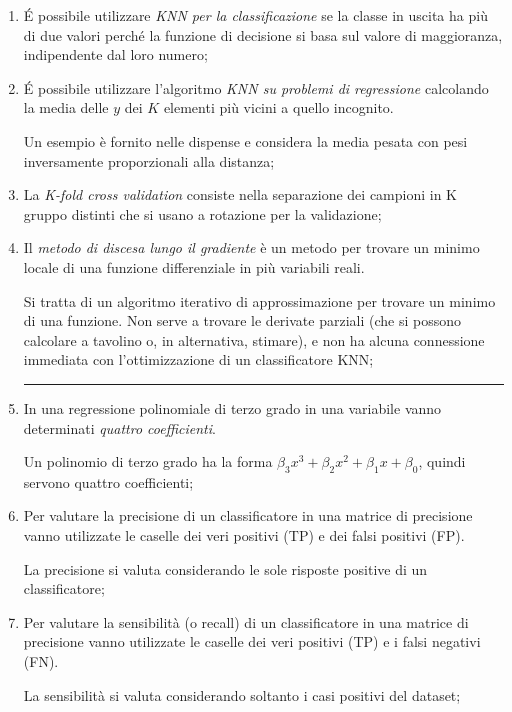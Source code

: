 \begin{enumerate}
	\item \'E possibile utilizzare \emph{KNN per la classificazione} se la classe in uscita ha più di due valori perché la funzione di decisione si basa sul valore di maggioranza, indipendente dal loro numero;

	\item \'E possibile utilizzare l’algoritmo \emph{KNN su problemi di regressione} calcolando la media delle \( y \) dei \( K \) elementi più vicini a quello incognito.

	Un esempio è fornito nelle dispense e considera la media pesata con pesi inversamente proporzionali alla distanza;

	\item La \emph{K-fold cross validation} consiste nella separazione dei campioni in K gruppo distinti che si usano a rotazione per la validazione;

	\item Il \emph{metodo di discesa lungo il gradiente} è un metodo per trovare un minimo locale di una funzione differenziale in più variabili reali.

	Si tratta di un algoritmo iterativo di approssimazione per trovare un minimo di una funzione. Non serve a trovare le derivate parziali (che si possono calcolare a tavolino o, in alternativa, stimare), e non ha alcuna connessione immediata con l’ottimizzazione di un classificatore KNN;

\rule{\linewidth}{0.4pt}

	\item In una regressione polinomiale di terzo grado in una variabile vanno determinati \emph{quattro coefficienti}.

	Un polinomio di terzo grado ha la forma \( \beta_3 x^3 + \beta_2 x^2 + \beta_1 x + \beta_0 \), quindi servono quattro coefficienti;

	\item Per valutare la precisione di un classificatore in una matrice di precisione vanno utilizzate le caselle dei veri positivi (TP) e dei falsi positivi (FP).

	La precisione si valuta considerando le sole risposte positive di un classificatore;

	\item Per valutare  la sensibilità (o recall) di un classificatore in una matrice di precisione vanno utilizzate le caselle dei veri positivi (TP) e i falsi negativi (FN).

	La sensibilità si valuta considerando soltanto i casi positivi del dataset;


\end{enumerate}
